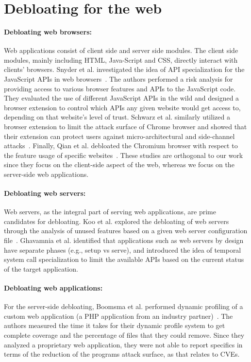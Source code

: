 \section{Debloating for the web}

\paragraph{Debloating web browsers:} Web applications consist of client side and server side modules. 
The client side modules, mainly including HTML, Java-Script and CSS, directly interact with clients' browsers. 
Snyder et al. investigated the idea of API specialization for the JavaScript APIs in web browsers~\cite{snyder2017vibrate}. 
The authors performed a risk analysis for providing access to various browser features and APIs to the JavaScript code.
They evaluated the use of different
JavaScript APIs in the wild and designed a browser extension
to control which APIs any given website would get access to, depending
on that website's level of trust. 
Schwarz et al. similarly utilized a browser
extension to limit the attack surface of Chrome browser and showed that their extension can protect users against micro-architectural and side-channel attacks~\cite{Schwarz2018}. 
Finally, Qian et al. debloated the Chromium browser with respect to the feature usage of specific websites~\cite{qian2020slimium}. 
These studies are orthogonal to our work since
they focus on the client-side aspect of the web, whereas we focus on the server-side web applications. 

\paragraph{Debloating web servers:} Web servers, as the integral part of serving web applications, are prime candidates for debloating. 
Koo et al. explored the debloating of web servers through the analysis of unused features based on a given web server configuration file~\cite{koo2019configuration}. 
Ghavamnia et al. identified that applications such as web servers by design have separate phases (e.g., setup vs serve), and introduced the idea of temporal system call specialization to limit the available APIs based on the current status of the target application. 

\paragraph{Debloating web applications:} For the server-side debloating, Boomsma et al. performed dynamic profiling of a custom web application (a PHP application from an industry partner)~\cite{boomsma2012Dead}. 
The authors measured the time it takes for their dynamic profile system to get
complete coverage and the percentage of files that they could remove. Since they analyzed a proprietary web application, they were not able to report specifics
in terms of the reduction of the programs attack surface, as that relates
to CVEs. 

